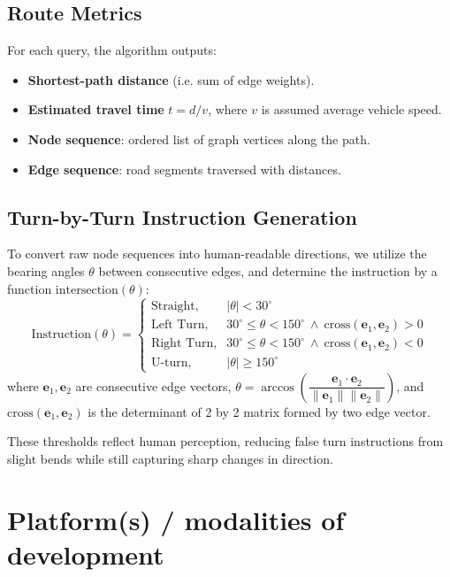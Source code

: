 \documentclass[fleqn,10pt]{olplainarticle}
\begin{document}
\subsection*{Route Metrics}
For each query, the algorithm outputs:
\begin{itemize}
    \item \textbf{Shortest-path distance} (i.e. sum of edge weights).
    \item \textbf{Estimated travel time} $t = d/v$, where $v$ is assumed average vehicle speed.
    \item \textbf{Node sequence}: ordered list of graph vertices along the path.
    \item \textbf{Edge sequence}: road segments traversed with distances.
\end{itemize}

\subsection*{Turn-by-Turn Instruction Generation}

To convert raw node sequences into human-readable directions, we utilize the bearing angles $\theta$ between consecutive edges, and determine the instruction by a function $\text{intersection}(\theta)$:
\[
\text{Instruction}(\theta) =
\begin{cases}
\text{Straight}, & |\theta| < 30^\circ \\[6pt]
\text{Left Turn}, & 30^\circ \leq \theta < 150^\circ \ \wedge \ \text{cross}(\mathbf{e}_1,\mathbf{e}_2) > 0 \\[6pt]
\text{Right Turn}, & 30^\circ \leq \theta < 150^\circ \ \wedge \ \text{cross}(\mathbf{e}_1,\mathbf{e}_2) < 0 \\[6pt]
\text{U-turn}, & |\theta| \geq 150^\circ
\end{cases}
\]
where $\mathbf{e}_1, \mathbf{e}_2$ are consecutive edge vectors, $\theta = \arccos\!\left( \dfrac{\mathbf{e}_1 \cdot \mathbf{e}_2}{\|\mathbf{e}_1\|\|\mathbf{e}_2\|} \right)$, and $\text{cross}(\mathbf{e}_1,\mathbf{e}_2)$ is the determinant of 2 by 2 matrix formed by two edge vector. 

These thresholds reflect human perception, reducing false turn instructions from slight bends while still capturing sharp changes in direction.

\section*{Platform(s) / modalities of development}
\end{document}
